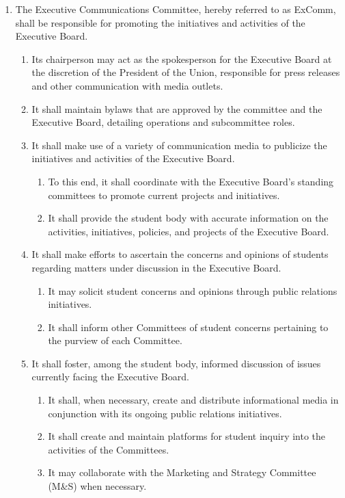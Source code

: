 \documentclass{uniondoc}
\begin{document}
\begin{enumerate}
\begin{enumerate}
  \end{enumerate}
\item The Executive Communications Committee, hereby referred to as ExComm, shall be responsible for promoting the initiatives and activities of the Executive Board.
  \begin{enumerate}
  \item Its chairperson may act as the spokesperson for the Executive Board at the discretion of the President of the Union, responsible for press releases and other communication with media outlets.
  \item It shall maintain bylaws that are approved by the committee and the Executive Board, detailing operations and subcommittee roles.
  \item It shall make use of a variety of communication media to publicize the initiatives and activities of the Executive Board.
    \begin{enumerate}
    \item To this end, it shall coordinate with the Executive Board’s standing committees to promote current projects and initiatives.
    \item It shall provide the student body with accurate information on the activities, initiatives, policies, and projects of the Executive Board.
    \end{enumerate}
  \item It shall make efforts to ascertain the concerns and opinions of students regarding matters under discussion in the Executive Board.
    \begin{enumerate}
    \item It may solicit student concerns and opinions through public relations initiatives.
    \item It shall inform other Committees of student concerns pertaining to the purview of each Committee.
    \end{enumerate}
  \item It shall foster, among the student body, informed discussion of issues currently facing the Executive Board.
    \begin{enumerate}
    \item It shall, when necessary, create and distribute informational media in conjunction with its ongoing public relations initiatives.
    \item It shall create and maintain platforms for student inquiry into the activities of the Committees.
    \item It may collaborate with the Marketing and Strategy Committee (M\&S) when necessary.

\end{enumerate}
\end{enumerate}
\end{enumerate}
\end{document}
